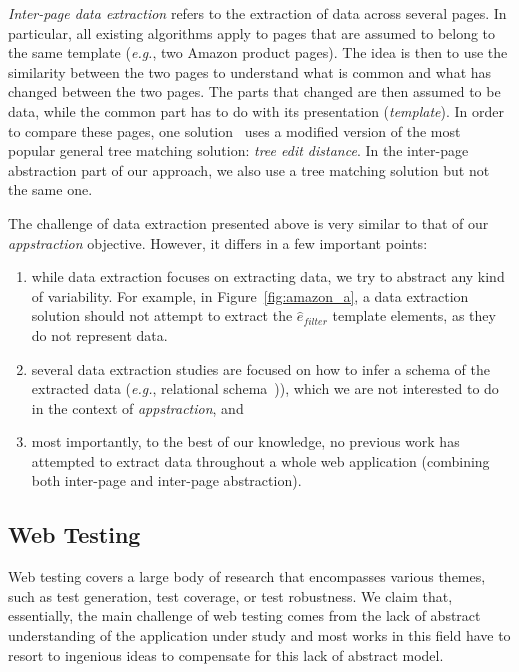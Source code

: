 \documentclass[sigconf,authordraft]{acmart}
\theoremstyle{definition}
\begin{document}
\emph{Inter-page data extraction} refers to the extraction of data across several pages.
In particular, all existing algorithms apply to pages that are assumed to belong to the same template (\emph{e.g.}, two Amazon product pages).
The idea is then to use the similarity between the two pages to understand what is common and what has changed between the two pages.
The parts that changed are then assumed to be data, while the common part has to do with its presentation (\emph{template}).
In order to compare these pages, one solution~\cite{DeReis2004AutomaticDistance} uses a modified version of the most popular general tree matching solution: \emph{tree edit distance}.
In the inter-page abstraction part of our approach, we also use a tree matching solution but not the same one.

The challenge of data extraction presented above is very similar to that of our \emph{appstraction} objective. However, it differs in a few important points:
\begin{enumerate}
    \item while data extraction focuses on extracting data, we try to abstract any kind of variability.
    For example, in Figure~\ref{fig:amazon_a}, a data extraction solution should not attempt to extract the $\hat{e}_{filter}$ template elements, as they do not represent data.
    \item several data extraction studies are focused on how to infer a schema of the extracted data (\emph{e.g.}, relational schema~\cite{ArasuExtractingPages,NestorovExtractingData})), which we are not interested to do in the context of \emph{appstraction}, and
    \item most importantly, to the best of our knowledge, no previous work has attempted to extract data throughout a whole web application (combining both inter-page and inter-page abstraction).
\end{enumerate}

\subsection{Web Testing}
Web testing covers a large body of research that encompasses various themes, such as test generation, test coverage, or test robustness.
We claim that, essentially, the main challenge of web testing comes from the lack of abstract understanding of the application under study and most works in this field have to resort to ingenious ideas to compensate for this lack of abstract model.
\end{document}
